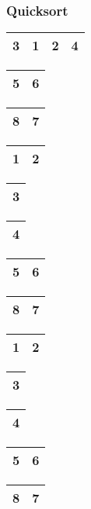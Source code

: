 \begin{frame}
\frametitle{Quicksort}
\begin{table}
\begin{tabular}{| c | c | c | c |}
\hline
\cellcolor{red!25}3 & 1 & 2 & 4 \\ 
\hline
\end{tabular}
\quad
\begin{tabular}{| c | c |}
\hline
\cellcolor{blue!25}5 & \cellcolor{blue!25}6\\ 
\hline
\end{tabular}
\quad
\begin{tabular}{| c | c |}
\hline
8 & 7 \\ 
\hline
\end{tabular}
\end{table}

\begin{table}
\begin{tabular}{| c | c |}
\hline
1 & 2\\ 
\hline
\end{tabular}
\quad
\begin{tabular}{| c |}
\hline
\cellcolor{blue!25}3\\ 
\hline
\end{tabular}
\quad
\begin{tabular}{| c |}
\hline
4 \\ 
\hline
\end{tabular}
\quad
\begin{tabular}{| c | c |}
\hline
\cellcolor{blue!25}5 & \cellcolor{blue!25}6\\ 
\hline
\end{tabular}
\quad
\begin{tabular}{| c | c |}
\hline
8 & 7 \\ 
\hline
\end{tabular}
\end{table}

\begin{table}
\begin{tabular}{| c | c |}
\hline
\cellcolor{red!25}1 & 2\\ 
\hline
\end{tabular}
\quad
\begin{tabular}{| c |}
\hline
\cellcolor{blue!25}3\\ 
\hline
\end{tabular}
\quad
\begin{tabular}{| c |}
\hline
4 \\ 
\hline
\end{tabular}
\quad
\begin{tabular}{| c | c |}
\hline
\cellcolor{blue!25}5 & \cellcolor{blue!25}6\\ 
\hline
\end{tabular}
\quad
\begin{tabular}{| c | c |}
\hline
8 & 7 \\ 
\hline
\end{tabular}
\end{table}


\end{frame}
